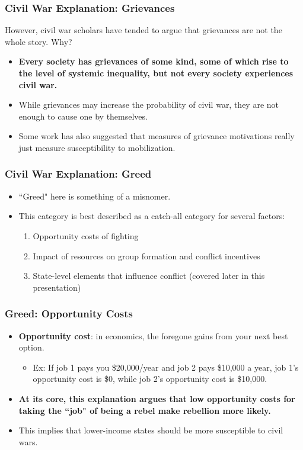 \documentclass[handout]{beamer}
\begin{document}
\begin{frame} 
	\frametitle{\LARGE{Civil War Explanation: Grievances}}
However, civil war scholars have tended to argue that grievances are not the whole story. Why?
	\begin{itemize}
		\item \textbf{Every society has grievances of some kind, some of which rise to the level of systemic inequality, but not every society experiences civil war.} \pause
		\item While grievances may increase the probability of civil war, they are not enough to cause one by themselves. \pause
		\item Some work has also suggested that measures of grievance motivations really just measure susceptibility to mobilization.
	\end{itemize}
\end{frame}

\begin{frame} 
\frametitle{\LARGE{Civil War Explanation: Greed}}
	\begin{itemize}
		\item ``Greed" here is something of a misnomer. \pause
		\item This category is best described as a catch-all category for several factors: \pause
		\begin{enumerate}
			\item Opportunity costs of fighting
			\item Impact of resources on group formation and conflict incentives
			\item State-level elements that influence conflict (covered later in this presentation)
		\end{enumerate} 
	\end{itemize}
\end{frame}

\begin{frame} 
\frametitle{\LARGE{Greed: Opportunity Costs}}
\begin{itemize}
	\item \textbf{Opportunity cost}: in economics, the foregone gains from your next best option. \pause
	\begin{itemize}
		\item Ex: If job 1 pays you \$20,000/year and job 2 pays \$10,000 a year, job 1's opportunity cost is \$0, while job 2's opportunity cost is \$10,000. \pause
	\end{itemize}
	\item \textbf{At its core, this explanation argues that low opportunity costs for taking the ``job" of being a rebel make rebellion more likely.} \pause
	\item This implies that lower-income states should be more susceptible to civil wars.
\end{itemize}
\end{frame}
\end{document}
